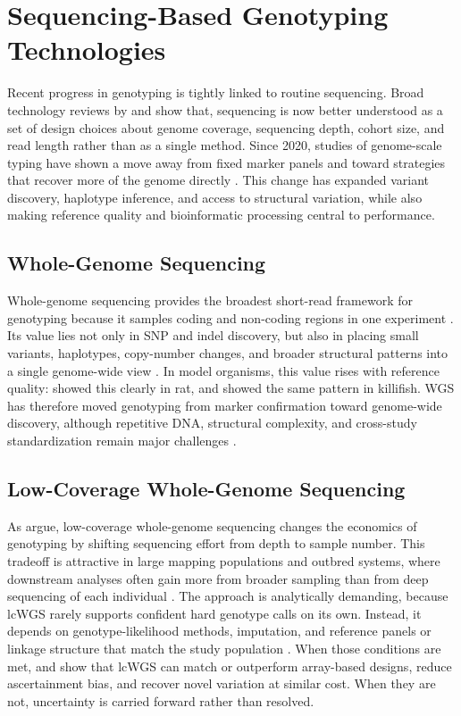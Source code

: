 \documentclass{article}
\begin{document}
\section{Sequencing-Based Genotyping Technologies}
Recent progress in genotyping is tightly linked to routine sequencing. Broad technology reviews by \textcite{satam2023next} and \textcite{kockum2023overview} show that, sequencing is now better understood as a set of design choices about genome coverage, sequencing depth, cohort size, and read length rather than as a single method. Since 2020, studies of genome-scale typing have shown a move away from fixed marker panels and toward strategies that recover more of the genome directly \parencite{uelze2020typing}. This change has expanded variant discovery, haplotype inference, and access to structural variation, while also making reference quality and bioinformatic processing central to performance.

\subsection{Whole-Genome Sequencing}
Whole-genome sequencing provides the broadest short-read framework for genotyping because it samples coding and non-coding regions in one experiment \parencite{uelze2020typing}. Its value lies not only in SNP and indel discovery, but also in placing small variants, haplotypes, copy-number changes, and broader structural patterns into a single genome-wide view \parencite{kockum2023overview}. In model organisms, this value rises with reference quality: \textcite{de2024revamped} showed this clearly in rat, and \textcite{johnson2025genome} showed the same pattern in killifish. WGS has therefore moved genotyping from marker confirmation toward genome-wide discovery, although repetitive DNA, structural complexity, and cross-study standardization remain major challenges \parencite{morton2020challenges,de2021towards,mahmoud2025hitchhiker}.

\subsection{Low-Coverage Whole-Genome Sequencing}
As \textcite{lou2021beginner} argue, low-coverage whole-genome sequencing changes the economics of genotyping by shifting sequencing effort from depth to sample number. This tradeoff is attractive in large mapping populations and outbred systems, where downstream analyses often gain more from broader sampling than from deep sequencing of each individual \parencite{martin2021low}. The approach is analytically demanding, because lcWGS rarely supports confident hard genotype calls on its own. Instead, it depends on genotype-likelihood methods, imputation, and reference panels or linkage structure that match the study population \parencite{lou2021beginner,deng2022comparison}. When those conditions are met, \textcite{chat2022ultra} and \textcite{liu2024accurate} show that lcWGS can match or outperform array-based designs, reduce ascertainment bias, and recover novel variation at similar cost. When they are not, uncertainty is carried forward rather than resolved.
\end{document}
